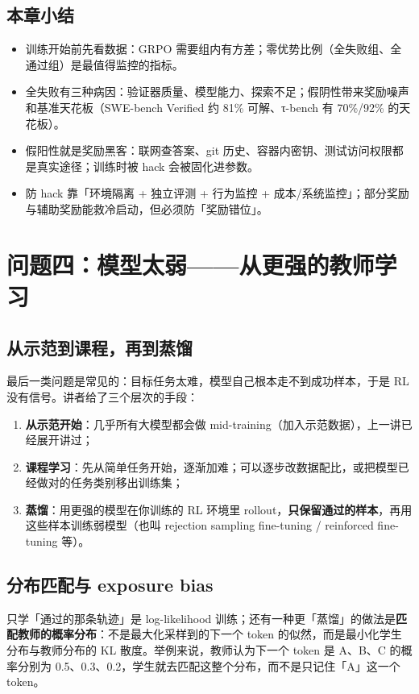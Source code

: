\documentclass[a4paper]{article}
\begin{document}
\subsection{本章小结}

\begin{itemize}
\item 训练开始前先看数据：GRPO 需要组内有方差；零优势比例（全失败组、全通过组）是最值得监控的指标。
\item 全失败有三种病因：验证器质量、模型能力、探索不足；假阴性带来奖励噪声和基准天花板（SWE-bench Verified 约 81\% 可解、τ-bench 有 70\%/92\% 的天花板）。
\item 假阳性就是奖励黑客：联网查答案、git 历史、容器内密钥、测试访问权限都是真实途径；训练时被 hack 会被固化进参数。
\item 防 hack 靠「环境隔离 + 独立评测 + 行为监控 + 成本/系统监控」；部分奖励与辅助奖励能救冷启动，但必须防「奖励错位」。
\end{itemize}

\section{问题四：模型太弱——从更强的教师学习}

\subsection{从示范到课程，再到蒸馏}

最后一类问题是常见的：目标任务太难，模型自己根本走不到成功样本，于是 RL 没有信号。讲者给了三个层次的手段：

\begin{enumerate}
\item \textbf{从示范开始}：几乎所有大模型都会做 mid-training（加入示范数据），上一讲已经展开讲过；
\item \textbf{课程学习}：先从简单任务开始，逐渐加难；可以逐步改数据配比，或把模型已经做对的任务类别移出训练集；
\item \textbf{蒸馏}：用更强的模型在你训练的 RL 环境里 rollout，\textbf{只保留通过的样本}，再用这些样本训练弱模型（也叫 rejection sampling fine-tuning / reinforced fine-tuning 等）。
\end{enumerate}

\subsection{分布匹配与 exposure bias}

只学「通过的那条轨迹」是 log-likelihood 训练；还有一种更「蒸馏」的做法是\textbf{匹配教师的概率分布}：不是最大化采样到的下一个 token 的似然，而是最小化学生分布与教师分布的 KL 散度。举例来说，教师认为下一个 token 是 A、B、C 的概率分别为 0.5、0.3、0.2，学生就去匹配这整个分布，而不是只记住「A」这一个 token。
\end{document}
